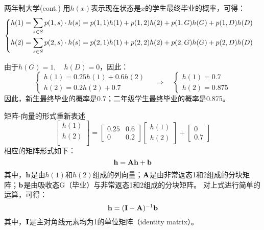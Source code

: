 \documentclass[t]{beamer}
\begin{document}
\begin{frame}{两年制大学(cont.)}\small
    用$h(x)$表示现在状态是$x$的学生最终毕业的概率，可得：
    \[\begin{cases}
     \vspace{1ex}  h(1)=\displaystyle\sum_{s\in S} p(1,s)\cdot h(s)=p(1,1)h(1)+p(1,2)h(2)+p(1,G)h(G)+p(1,D)h(D)\\
    h(2)=\displaystyle\sum_{s\in S} p(2,s)\cdot h(s)=p(2,1)h(1)+p(2,2)h(2)+p(2,G)h(G)+p(2,D)h(D)
    \end{cases} \]
    
    由于$h(G)=1,\quad h(D)=0$，因此：
    \[\begin{cases}
    h(1)=0.25h(1)+0.6h(2)\\
    h(2)=0.2h(2)+0.7
    \end{cases} \quad\Rightarrow\quad \begin{cases}
    h(1)=0.7\\
    h(2)=0.875
    \end{cases}\]
    因此，新生最终毕业的概率是0.7；二年级学生最终毕业的概率是0.875。
\end{frame}


\begin{frame}{矩阵-向量的形式重新表述}
    \[\begin{bmatrix}
        h(1)\\
        h(2)\\
        \end{bmatrix}=\begin{bmatrix}
        0.25 & 0.6\\
        0 &0.2
        \end{bmatrix}\begin{bmatrix}
        h(1)\\h(2)
        \end{bmatrix}+\begin{bmatrix}
        0\\0.7
        \end{bmatrix} \]
        相应的矩阵形式如下：
        \begin{equation*}
        {\bf h}={\bf Ah}+{\bf b}
        \end{equation*}
        其中，${\bf h}$是由$h(1)$和$h(2)$组成的列向量；${\bf A}$是由非常返态1和2组成的分块矩阵；${\bf b}$是由吸收态G（毕业）与非常返态1和2组成的分块矩阵。
        对上式进行简单的运算，可得：
        \begin{equation*}
       {\bf h}=({\bf I}-{\bf A})^{-1}{\bf b}
       \end{equation*}
       其中，${\bf I}$是主对角线元素均为1的单位矩阵（identity matrix）。    
\end{frame}
\end{document}
